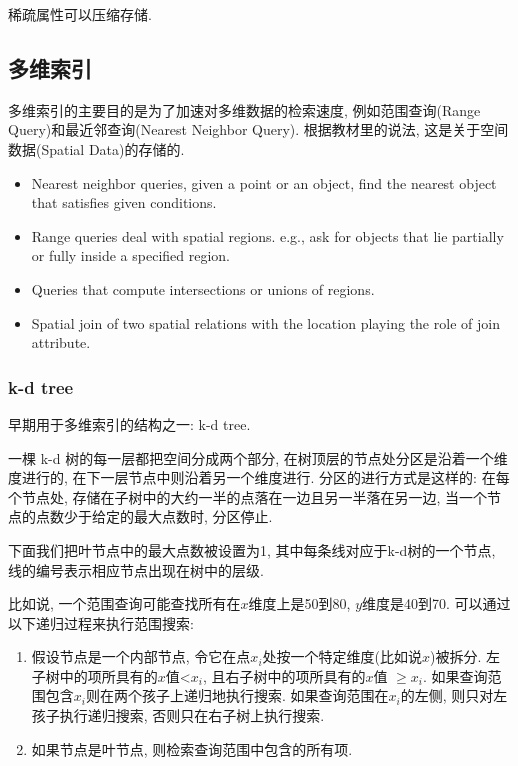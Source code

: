 稀疏属性可以压缩存储.

\subsection{多维索引}

多维索引的主要目的是为了加速对多维数据的检索速度, 例如范围查询(Range Query)和最近邻查询(Nearest Neighbor Query). 根据教材里的说法, 这是关于空间数据(Spatial Data)的存储的.
\begin{itemize}
    \item Nearest neighbor queries, given a point or an object, find the nearest object that satisfies given conditions.
    \item Range queries deal with spatial regions. e.g., ask for objects that lie partially or fully inside a specified region.
    \item Queries that compute intersections or unions of regions.
    \item Spatial join of two spatial relations with the location playing the role of join attribute.
\end{itemize}

\subsubsection{k-d tree}

早期用于多维索引的结构之一: k-d tree.

一棵 k-d 树的每一层都把空间分成两个部分, 在树顶层的节点处分区是沿着一个维度进行的, 在下一层节点中则沿着另一个维度进行. 分区的进行方式是这样的: 在每个节点处, 存储在子树中的大约一半的点落在一边且另一半落在另一边, 当一个节点的点数少于给定的最大点数时, 分区停止.

下面我们把叶节点中的最大点数被设置为1, 其中每条线对应于k-d树的一个节点, 线的编号表示相应节点出现在树中的层级.

比如说, 一个范围查询可能查找所有在$x$维度上是50到80, $y$维度是40到70. 可以通过以下递归过程来执行范围搜索:
\begin{enumerate}
    \item 假设节点是一个内部节点, 令它在点$x_i$处按一个特定维度(比如说$x$)被拆分. 左子树中的项所具有的$ x$值<$x_i$, 且右子树中的项所具有的$ x $值 $\geq x_i$. 如果查询范围包含$x_i$则在两个孩子上递归地执行搜索. 如果查询范围在$x_i$的左侧, 则只对左孩子执行递归搜索, 否则只在右子树上执行搜索.
    \item 如果节点是叶节点, 则检索查询范围中包含的所有项.
\end{enumerate}

